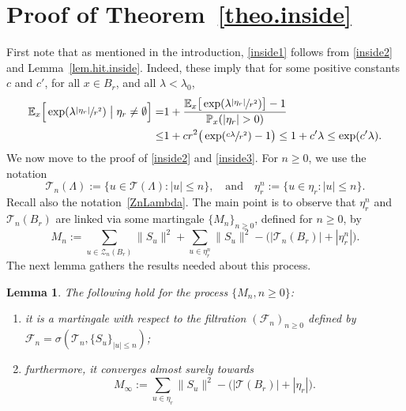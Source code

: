 \documentclass[11pt]{article}
\numberwithin{equation}{section}
\theoremstyle{plain}
\newtheorem{lemma}[theorem]{Lemma}
\theoremstyle{definition}
\newcommand{\1}{{\text{\Large $\mathfrak 1$}}}
\begin{document}
\section{Proof of Theorem~\ref{theo.inside}}\label{sec-inside}
First note that as mentioned in the introduction,
\eqref{inside1} follows from \eqref{inside2} and Lemma~\ref{lem.hit.inside}.
Indeed, these imply that for some positive constants $c$ and $c'$,
for all $x\in B_r$, and all $\lambda<\lambda_0$,
\begin{equation*}
\begin{split}
\mathbb E_x\Big[\exp(\lambda \sfrac{|\eta_r|}{r^2})
\bigm| \eta_r\neq \emptyset\Big]
=& 1+\frac{\mathbb E_x\big[\exp(\lambda \sfrac{|\eta_r|}{r^2})\big]
-1}{\mathbb P_x(|\eta_r|>0)} \\
\le& 1+ cr^2 \big(\exp(\sfrac{c\lambda}{r^2}) - 1\big) \le
1+c'\lambda \le \exp(c'\lambda).
\end{split}
\end{equation*}
We now move to the proof of \eqref{inside2} and \eqref{inside3}.
For $n\ge 0$, we use the notation
\[
\mathcal T_n(\Lambda):=
\{u\in \mathcal T(\Lambda): |u|\le n\}, \quad\text{and}\quad
\eta^n_r:=\{u\in \eta_r: |u|\le n\}.
\]
Recall also the notation~\eqref{ZnLambda}.
The main point is to observe that $\eta^n_r$ and $\mathcal T_n(B_r)$
are linked via some martingale $\{M_n\}_{n\ge 0}$, defined for $n\ge 0$, by
\begin{equation*}%
M_n:= \sum_{u\in \mathcal Z_n(B_r)}
\|S_u\|^2 + \sum_{u\in \eta^n_r} \|S_u\|^2-
\big(|\mathcal T_n(B_r)|+|\eta^n_r|\big).
\end{equation*}
The next lemma gathers the results needed about this process.
\begin{lemma}\label{lem.M}
The following hold for the process $\{M_n, n\ge 0\}$:
\begin{enumerate}
\item it is a martingale with respect to the
filtration $(\mathcal F_n)_{n\ge 0}$ defined by
$\mathcal F_n \!=\! \sigma(\mathbf{\mathcal T}_n, \{S_u\}_{|u|\le n})$;
\item furthermore, it converges almost surely towards
\[
M_\infty := \sum_{u\in \eta_r} \|S_u\|^2-
\big(|\mathbf{\mathcal T}(B_r)|+
|\eta_r|\big).
\]
\end{enumerate}
\end{lemma}
\end{document}
